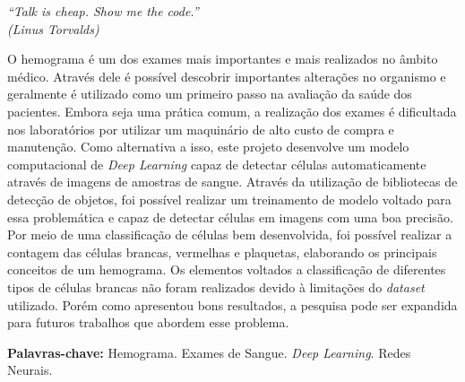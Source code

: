 \documentclass[
	10pt,				%
	oneside,
	a4paper,			%
	chapter=TITLE,		%
	english,			%
	brazil				%
	]{abntex2}
\begin{document}
\begin{epigrafe}
    \vspace*{\fill}
	\begin{flushright}
		\textit{``Talk is cheap. Show me the code.''\\
		(Linus Torvalds)}
	\end{flushright}
\end{epigrafe}

\setlength{\absparsep}{18pt} %
\begin{resumo}
    O hemograma é um dos exames mais importantes e mais realizados no âmbito médico. Através dele é possível descobrir importantes alterações no organismo e geralmente é utilizado como um primeiro passo na avaliação da saúde dos pacientes. Embora seja uma prática comum, a realização dos exames é dificultada nos laboratórios por utilizar um maquinário de alto custo de compra e manutenção. Como alternativa a isso, este projeto desenvolve um modelo computacional de \emph{Deep Learning} capaz de detectar células automaticamente através de imagens de amostras de sangue. Através da utilização de bibliotecas de detecção de objetos, foi possível realizar um treinamento de modelo voltado para essa problemática e capaz de detectar células em imagens com uma boa precisão. Por meio de uma classificação de células bem desenvolvida, foi possível realizar a contagem das células brancas, vermelhas e plaquetas, elaborando os principais conceitos de um hemograma. Os elementos voltados a classificação de diferentes tipos de células brancas não foram realizados devido à limitações do \emph{dataset} utilizado. Porém como apresentou bons resultados, a pesquisa pode ser expandida para futuros trabalhos que abordem esse problema.
	
	\textbf{Palavras-chave:} Hemograma. Exames de Sangue. \emph{Deep Learning}. Redes Neurais.
\end{resumo}
\end{document}
